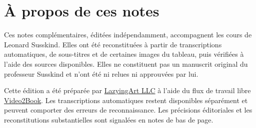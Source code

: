 \documentclass[11pt,oneside]{book}
\begin{document}
\frontmatter
\hypersetup{pageanchor=false}

\hypersetup{pageanchor=true}

\clearpage
\chapter{À propos de ces notes}
Ces notes complémentaires, éditées indépendamment, accompagnent les cours de Leonard Susskind. Elles ont été reconstituées à partir de transcriptions automatiques, de sous-titres et de certaines images du tableau, puis vérifiées à l’aide des sources disponibles. Elles ne constituent pas un manuscrit original du professeur Susskind et n’ont été ni relues ni approuvées par lui.

Cette édition a été préparée par \href{https://lazying.art}{LazyingArt LLC} à l’aide du flux de travail libre \href{https://github.com/lachlanchen/Video2Book}{Video2Book}. Les transcriptions automatiques restent disponibles séparément et peuvent comporter des erreurs de reconnaissance. Les précisions éditoriales et les reconstitutions substantielles sont signalées en notes de bas de page.
\clearpage
\tableofcontents
\mainmatter










\end{document}
